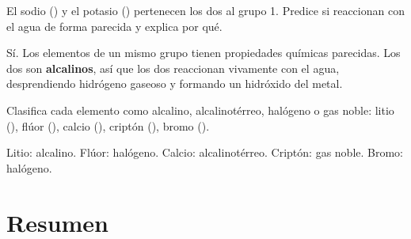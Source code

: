 \begin{exercise}
    El sodio () y el potasio () pertenecen los dos al grupo 1. Predice si reaccionan con el agua de forma parecida y explica por qué.
    \begin{solu}
        Sí. Los elementos de un mismo grupo tienen propiedades químicas parecidas. Los dos son \textbf{alcalinos}, así que los dos reaccionan vivamente con el agua, desprendiendo hidrógeno gaseoso y formando un hidróxido del metal.
    \end{solu}
\end{exercise}

\begin{exercise}
    Clasifica cada elemento como alcalino, alcalinotérreo, halógeno o gas noble: litio (), flúor (), calcio (), criptón (), bromo ().
    \begin{solu}
        Litio: alcalino. Flúor: halógeno. Calcio: alcalinotérreo. Criptón: gas noble. Bromo: halógeno.
    \end{solu}
\end{exercise}


\section*{Resumen}

